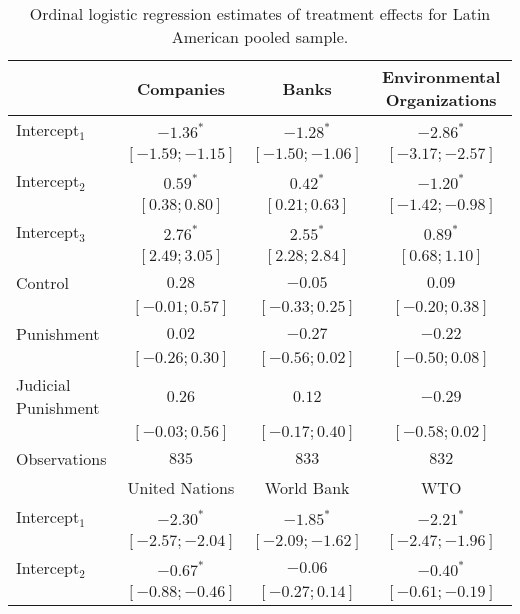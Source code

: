 \begin{table}[h]
\begin{center}
\caption{Ordinal logistic regression estimates of treatment effects for Latin American pooled sample.}
\begin{threeparttable}
\begin{tabular}{l c c c}
\hline
 & Companies & Banks & Environmental
Organizations \\
\hline
Intercept$_1$       & $-1.36^{*}$       & $-1.28^{*}$       & $-2.86^{*}$       \\
                    & $ [-1.59; -1.15]$ & $ [-1.50; -1.06]$ & $ [-3.17; -2.57]$ \\
Intercept$_2$       & $0.59^{*}$        & $0.42^{*}$        & $-1.20^{*}$       \\
                    & $ [ 0.38;  0.80]$ & $ [ 0.21;  0.63]$ & $ [-1.42; -0.98]$ \\
Intercept$_3$       & $2.76^{*}$        & $2.55^{*}$        & $0.89^{*}$        \\
                    & $ [ 2.49;  3.05]$ & $ [ 2.28;  2.84]$ & $ [ 0.68;  1.10]$ \\
Control             & $0.28$            & $-0.05$           & $0.09$            \\
                    & $ [-0.01;  0.57]$ & $ [-0.33;  0.25]$ & $ [-0.20;  0.38]$ \\
Punishment          & $0.02$            & $-0.27$           & $-0.22$           \\
                    & $ [-0.26;  0.30]$ & $ [-0.56;  0.02]$ & $ [-0.50;  0.08]$ \\
Judicial Punishment & $0.26$            & $0.12$            & $-0.29$           \\
                    & $ [-0.03;  0.56]$ & $ [-0.17;  0.40]$ & $ [-0.58;  0.02]$ \\
\hline
Observations        & $835$             & $833$             & $832$             \\
\hline
 & United Nations & World Bank & WTO \\
\hline
Intercept$_1$       & $-2.30^{*}$       & $-1.85^{*}$       & $-2.21^{*}$       \\
                    & $ [-2.57; -2.04]$ & $ [-2.09; -1.62]$ & $ [-2.47; -1.96]$ \\
Intercept$_2$       & $-0.67^{*}$       & $-0.06$           & $-0.40^{*}$       \\
                    & $ [-0.88; -0.46]$ & $ [-0.27;  0.14]$ & $ [-0.61; -0.19]$ \\

\end{tabular}
\end{threeparttable}
\end{center}
\end{table}
